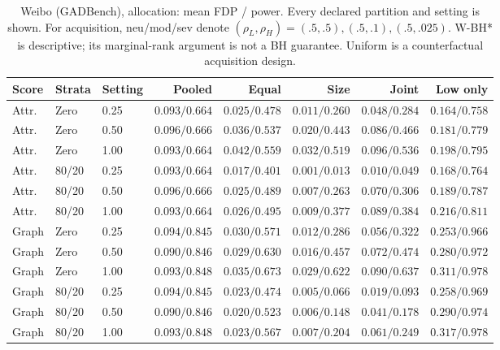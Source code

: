 \begin{table}[t]\centering\scriptsize\setlength{\tabcolsep}{3pt}
\caption{Weibo (GADBench), allocation: mean FDP / power. Every declared partition and setting is shown. For acquisition, neu/mod/sev denote $(\rho_L,\rho_H)=(.5,.5),(.5,.1),(.5,.025)$. W-BH* is descriptive; its marginal-rank argument is not a BH guarantee. Uniform is a counterfactual acquisition design.}
\begin{tabular}{lllrrrrr}\toprule Score & Strata & Setting & Pooled & Equal & Size & Joint & Low only\\\midrule
Attr. & Zero & 0.25 & $0.093/0.664$ & $0.025/0.478$ & $0.011/0.260$ & $0.048/0.284$ & $0.164/0.758$ \\
Attr. & Zero & 0.50 & $0.096/0.666$ & $0.036/0.537$ & $0.020/0.443$ & $0.086/0.466$ & $0.181/0.779$ \\
Attr. & Zero & 1.00 & $0.093/0.664$ & $0.042/0.559$ & $0.032/0.519$ & $0.096/0.536$ & $0.198/0.795$ \\
Attr. & 80/20 & 0.25 & $0.093/0.664$ & $0.017/0.401$ & $0.001/0.013$ & $0.010/0.049$ & $0.168/0.764$ \\
Attr. & 80/20 & 0.50 & $0.096/0.666$ & $0.025/0.489$ & $0.007/0.263$ & $0.070/0.306$ & $0.189/0.787$ \\
Attr. & 80/20 & 1.00 & $0.093/0.664$ & $0.026/0.495$ & $0.009/0.377$ & $0.089/0.384$ & $0.216/0.811$ \\
Graph & Zero & 0.25 & $0.094/0.845$ & $0.030/0.571$ & $0.012/0.286$ & $0.056/0.322$ & $0.253/0.966$ \\
Graph & Zero & 0.50 & $0.090/0.846$ & $0.029/0.630$ & $0.016/0.457$ & $0.072/0.474$ & $0.280/0.972$ \\
Graph & Zero & 1.00 & $0.093/0.848$ & $0.035/0.673$ & $0.029/0.622$ & $0.090/0.637$ & $0.311/0.978$ \\
Graph & 80/20 & 0.25 & $0.094/0.845$ & $0.023/0.474$ & $0.005/0.066$ & $0.019/0.093$ & $0.258/0.969$ \\
Graph & 80/20 & 0.50 & $0.090/0.846$ & $0.020/0.523$ & $0.006/0.148$ & $0.041/0.178$ & $0.290/0.974$ \\
Graph & 80/20 & 1.00 & $0.093/0.848$ & $0.023/0.567$ & $0.007/0.204$ & $0.061/0.249$ & $0.317/0.978$ \\
\bottomrule\end{tabular}\end{table}

